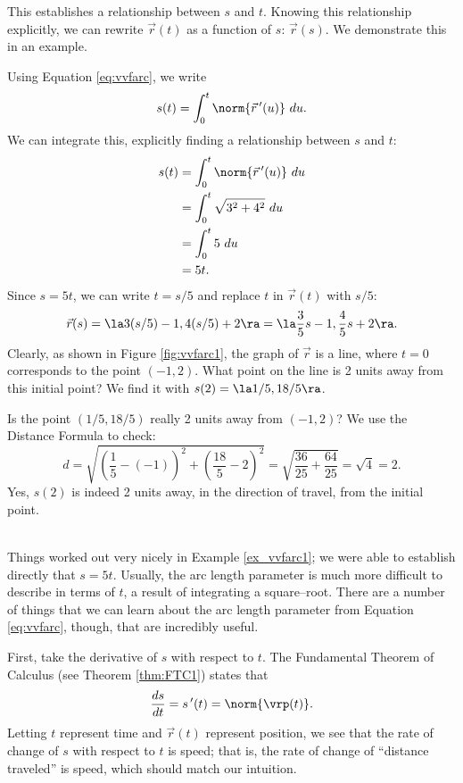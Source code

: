 This establishes a relationship between $s$ and $t$. Knowing this relationship explicitly, we can rewrite $\vec r(t)$ as a function of $s$: $\vec r(s)$. We demonstrate this in an example.\\

{Using Equation \eqref{eq:vvfarc}, we write
$$s(t) = \int_0^t \norm{\vec r\,'(u)}\ du.$$
We can integrate this, explicitly finding a relationship between $s$ and $t$:
\begin{align*}
s(t) &= \int_0^t \norm{\vec r\,'(u)}\ du \\
			&= \int_0^t \sqrt{3^2+4^2}\ du\\
			&= \int_0^t 5\ du\\
			&= 5t.
\end{align*}
Since $s=5t$, we can write $t=s/5$ and replace $t$ in $\vec r(t)$ with $s/5$:
$$\vec r(s) = \la 3(s/5)-1, 4(s/5)+2\ra = \la \frac35s-1,\frac45s+2\ra.$$
Clearly, as shown in Figure \ref{fig:vvfarc1}, the graph of $\vec r$ is a line, where $t=0$ corresponds to the point $(-1,2)$. What point on the line is 2 units away from this initial point? We find it with $s(2) = \la 1/5, 18/5\ra$. 

Is the point $(1/5,18/5)$ really 2 units away from $(-1,2)$? We use the Distance Formula to check:
$$d = \sqrt{\left(\frac15-(-1)\right)^2+ \left(\frac{18}5-2\right)^2} = \sqrt{\frac{36}{25}+\frac{64}{25}} = \sqrt{4}=2.$$
Yes, $s(2)$ is indeed 2 units away, in the direction of travel, from the initial point.
}\\

Things worked out very nicely in Example \ref{ex_vvfarc1}; we were able to establish directly that $s=5t$. Usually, the arc length parameter is much more difficult to describe in terms of $t$, a result of integrating a square--root. There are a number of things that we can learn about the arc length parameter from Equation \eqref{eq:vvfarc}, though, that are incredibly useful.

First, %
take the derivative of $s$ with respect to $t$. The Fundamental Theorem of Calculus (see Theorem \ref{thm:FTC1}) states that
\begin{equation}
\frac{ds}{dt}=s\,'(t) = \norm{\vrp(t)}.\label{eq:vvfarc3}
\end{equation}
Letting $t$ represent time and $\vec r(t)$ represent position, we see that the rate of change of $s$ with respect to $t$ is speed; that is, the rate of change of ``distance traveled'' is speed, which should match our intuition.

